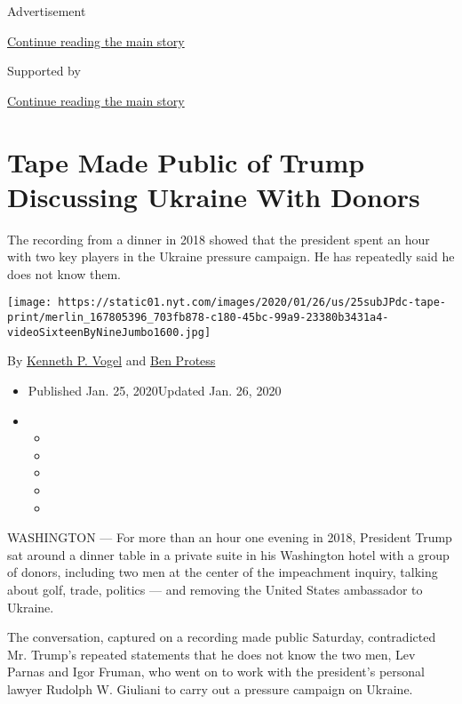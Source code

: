 Advertisement

\protect\hyperlink{after-top}{Continue reading the main story}

Supported by

\protect\hyperlink{after-sponsor}{Continue reading the main story}

\hypertarget{tape-made-public-of-trump-discussing-ukraine-with-donors}{%
\section{Tape Made Public of Trump Discussing Ukraine With
Donors}\label{tape-made-public-of-trump-discussing-ukraine-with-donors}}

The recording from a dinner in 2018 showed that the president spent an
hour with two key players in the Ukraine pressure campaign. He has
repeatedly said he does not know them.

\texttt{[image: https://static01.nyt.com/images/2020/01/26/us/25subJPdc-tape-print/merlin\_167805396\_703fb878-c180-45bc-99a9-23380b3431a4-videoSixteenByNineJumbo1600.jpg]}

By \href{https://www.nytimes.com/by/kenneth-p-vogel}{Kenneth P. Vogel}
and \href{https://www.nytimes.com/by/ben-protess}{Ben Protess}

\begin{itemize}
\item
  Published Jan. 25, 2020Updated Jan. 26, 2020
\item
  \begin{itemize}
  \item
  \item
  \item
  \item
  \item
  \end{itemize}
\end{itemize}

WASHINGTON --- For more than an hour one evening in 2018, President
Trump sat around a dinner table in a private suite in his Washington
hotel with a group of donors, including two men at the center of the
impeachment inquiry, talking about golf, trade, politics --- and
removing the United States ambassador to Ukraine.

The conversation, captured on a recording made public Saturday,
contradicted Mr. Trump's repeated statements that he does not know the
two men, Lev Parnas and Igor Fruman, who went on to work with the
president's personal lawyer Rudolph W. Giuliani to carry out a pressure
campaign on Ukraine.

